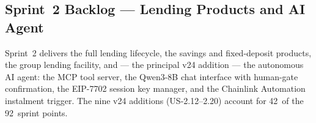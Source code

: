 \subsection{Sprint~2 Backlog --- Lending Products and AI Agent}
\label{sec:sprint2}

Sprint~2 delivers the full lending lifecycle, the savings and fixed-deposit
products, the group lending facility, and --- the principal v24 addition ---
the autonomous AI agent: the MCP tool server, the Qwen3-8B chat interface
with human-gate confirmation, the EIP-7702 session key manager, and the
Chainlink Automation instalment trigger. The nine v24 additions
(US-2.12--2.20) account for 42~of the 92~sprint points.

